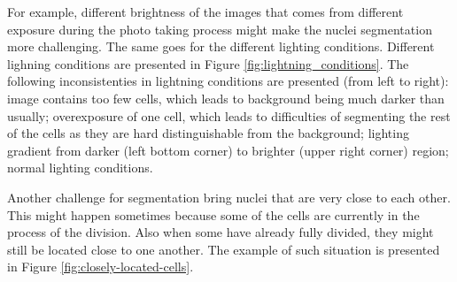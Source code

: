 For example, different brightness of the images that comes from different exposure during the photo taking process might make the nuclei segmentation more challenging. The same goes for the different lighting conditions. Different lighning conditions are presented in Figure \ref{fig:lightning_conditions}. The following inconsistenties in lightning conditions are presented (from left to right): image contains too few cells, which leads to background being much darker than usually; overexposure of one cell, which leads to difficulties of segmenting the rest of the cells as they are hard distinguishable from the background; lighting gradient from darker (left bottom corner) to brighter (upper right corner) region; normal lighting conditions.

Another challenge for segmentation bring nuclei that are very close to each other. This might happen sometimes because some of the cells are currently in the process of the division. Also when some have already fully divided, they might still be located close to one another. The example of such situation is presented in Figure \ref{fig:closely-located-cells}.



